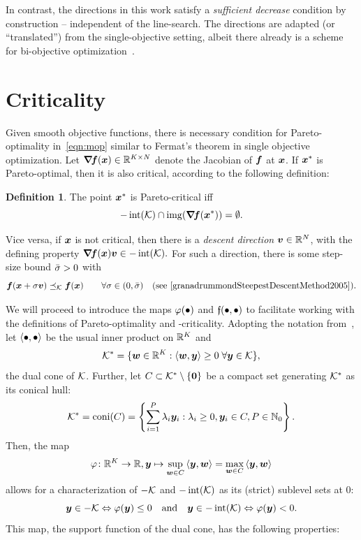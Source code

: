 \documentclass{article}
\theoremstyle{plain}
\theoremstyle{definition}
\newtheorem{definition}[theorem]{Definition}
\begin{document}
In contrast, the directions in this work satisfy a \emph{sufficient decrease}
condition by construction -- independent of the line-search.
The directions are adapted (or “translated”) from the single-objective 
setting, 
albeit there already is a scheme for bi-objective optimization~\cite{elboulqeExplicitThreeTermPolak}.

\section{Criticality}
Given smooth objective functions, there is necessary condition for Pareto-optimality
in~\eqref{eqn:mop} similar to Fermat's theorem in single objective optimization.
Let $\bm{\nabla}\!\bm{f}(\bm{x}) \in \mathbb R^{K \times N}$ denote the Jacobian of $\bm{f}$
at $\bm{x}$. 
If $\bm{x}^*$ is Pareto-optimal, then it is also critical, according to the following definition:
\begin{definition}
	The point $\bm{x}^*$ is Pareto-critical iff
	\begin{equation*}
		-\operatorname{int}(\mathcal K) \cap \operatorname{img}(\bm{\nabla}\!\bm{f}(\bm{x}^*)) = \emptyset.
	\end{equation*}
\end{definition}

Vice versa, if $\bm{x}$ is not critical, then there is a \emph{descent direction}
$\bm{v} \in \mathbb R^N$, with the defining property 
$
\bm{\nabla}\!\bm{f}(\bm{x}) \bm{v} \in -\operatorname{int}(\mathcal K).
$
For such a direction, there is some step-size bound $\bar{\sigma}>0$ with
$$
	\bm{f}(\bm{x} + \sigma \bm{v}) \preceq_\mathcal K \bm{f}(\bm{x}) \qquad \forall \sigma \in (0, \bar{\sigma})
	\quad
	\text{(see \cite{granadrummondSteepestDescentMethod2005})}
	.
$$

We will proceed to introduce the maps $\varphi(\bullet)$ and $\mathfrak{f}(\bullet,\bullet)$ to 
facilitate working with the definitions of Pareto-optimality and -criticality.
Adopting the notation from~\cite{%
granadrummondSteepestDescentMethod2005,%
lucambioperezNonlinearConjugateGradient2018%
},
let $\left\langle \bullet, \bullet \right\rangle$ be the usual inner product on $\mathbb R^K$ and 
$$\mathcal K^* = 
	\{
		\bm{w}\in \mathbb R^K: \left\langle \bm{w}, \bm{y} \right\rangle \ge 0 
		\; \forall \bm{y}\in \mathcal K
	\}
,$$
the dual cone of $\mathcal K$.
Further, let $C \subset \mathcal K^*\setminus \{\bm{0}\}$ be a compact set generating 
$\mathcal K^*$ as its conical hull: 
$$
	\mathcal K^*
	=
	\operatorname{coni}(C)
	=
	\left\{
		\sum_{i=1}^{P}
		\lambda_i \bm{y}_i
		:
		\lambda_i \ge 0,
		\bm{y}_i \in C,
		P \in \mathbb N_0
	\right\}
	.
$$
Then, the map 
\begin{equation}	
\varphi \colon \mathbb R^K \to \mathbb R, 
\bm{y}\mapsto 
	\sup_{\bm{w} \in C}\left\langle \bm{y}, \bm{w} \right\rangle
	= 
	\max_{\bm{w} \in C}\left\langle \bm{y}, \bm{w} \right\rangle
	\label{eqn:phiC_def}
\end{equation}
allows for a characterization of $-\mathcal K$ and $-\operatorname{int}(\mathcal K)$ as its
(strict) sublevel sets at $0$:
$$
\bm{y} \in -\mathcal K \Leftrightarrow \varphi(\bm{y}) \leq 0
\quad\text{and}\quad
\bm{y} \in -\operatorname{int}(\mathcal K) \Leftrightarrow \varphi(\bm{y}) < 0.
$$
This map, the support function of the dual cone, has the following properties:
\end{document}
